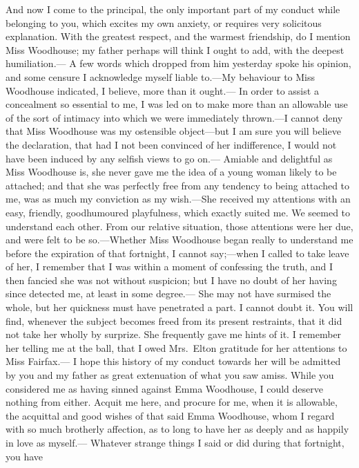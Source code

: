 And now I come to the principal, the only important part of my
conduct while belonging to you, which excites my own anxiety,
or requires very solicitous explanation.  With the greatest respect,
and the warmest friendship, do I mention Miss Woodhouse; my father
perhaps will think I ought to add, with the deepest humiliation.---%
A few words which dropped from him yesterday spoke his opinion,
and some censure I acknowledge myself liable to.---My behaviour
to Miss Woodhouse indicated, I believe, more than it ought.---%
In order to assist a concealment so essential to me, I was led
on to make more than an allowable use of the sort of intimacy
into which we were immediately thrown.---I cannot deny that Miss
Woodhouse was my ostensible object---but I am sure you will believe
the declaration, that had I not been convinced of her indifference,
I would not have been induced by any selfish views to go on.---%
Amiable and delightful as Miss Woodhouse is, she never gave me
the idea of a young woman likely to be attached; and that she was
perfectly free from any tendency to being attached to me, was as much
my conviction as my wish.---She received my attentions with an easy,
friendly, goodhumoured playfulness, which exactly suited me.
We seemed to understand each other.  From our relative situation,
those attentions were her due, and were felt to be so.---Whether Miss
Woodhouse began really to understand me before the expiration of
that fortnight, I cannot say;---when I called to take leave of her,
I remember that I was within a moment of confessing the truth,
and I then fancied she was not without suspicion; but I have no
doubt of her having since detected me, at least in some degree.---%
She may not have surmised the whole, but her quickness must
have penetrated a part.  I cannot doubt it.  You will find,
whenever the subject becomes freed from its present restraints,
that it did not take her wholly by surprize.  She frequently gave
me hints of it.  I remember her telling me at the ball, that I
owed Mrs.\ Elton gratitude for her attentions to Miss Fairfax.---%
I hope this history of my conduct towards her will be admitted
by you and my father as great extenuation of what you saw amiss.
While you considered me as having sinned against Emma Woodhouse,
I could deserve nothing from either.  Acquit me here, and procure
for me, when it is allowable, the acquittal and good wishes of that
said Emma Woodhouse, whom I regard with so much brotherly affection,
as to long to have her as deeply and as happily in love as myself.---%
Whatever strange things I said or did during that fortnight, you have
